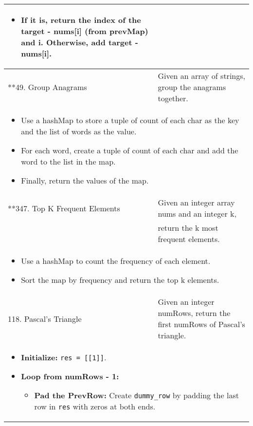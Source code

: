 \begin{summary}
\begin{center}
\begin{tabular}{ll}
{\begin{itemize}
\begin{itemize}
                        \item If it is, return the index of the target - nums[i] (from prevMap) and i. Otherwise, add target - nums[i].
                    \end{itemize}
                \end{itemize}
            } \\
            \midrule
            **49. Group Anagrams & Given an array of strings, group the anagrams together. \\
            \multicolumn{2}{p{\linewidth}}{
                \begin{itemize}
                    \item Use a hashMap to store a tuple of count of each char as the key and the list of words as the value.
                    \item For each word, create a tuple of count of each char and add the word to the list in the map.
                    \item Finally, return the values of the map.
                \end{itemize}
            } \\
            \midrule
            **347. Top K Frequent Elements & Given an integer array nums and an integer k, \\
            & return the k most frequent elements. \\
            \multicolumn{2}{p{\linewidth}}{
                \begin{itemize}
                    \item Use a hashMap to count the frequency of each element.
                    \item Sort the map by frequency and return the top k elements.
                \end{itemize}
            } \\
            \midrule
            118. Pascal's Triangle & Given an integer numRows, return the first numRows of Pascal's triangle. \\
            \multicolumn{2}{p{\linewidth}}{
                \begin{itemize}
                    \item \textbf{Initialize:} \texttt{res = [[1]]}.
                    \item \textbf{Loop from numRows - 1:}
                    \begin{itemize}
                        \item \textbf{Pad the PrevRow:} Create \texttt{dummy\_row} by padding the last row in \texttt{res} with zeros at both ends. 

\end{itemize}
\end{itemize}}
\end{tabular}
\end{center}
\end{summary}
